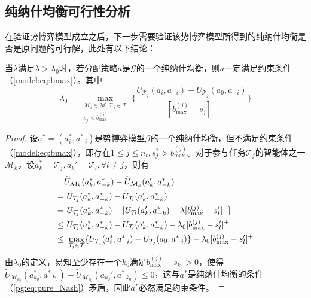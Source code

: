\subsection{纯纳什均衡可行性分析}
\label{pg:mwlu:pgexist}
在验证势博弈模型成立之后，下一步需要验证该势博弈模型所得到的纯纳什均衡是否是原问题的可行解，此处有以下结论：

\begin{proposition}[纳什均衡可行性]
\label{pg:pro:feasibility}
	当$\lambda$满足$\lambda > \lambda_0$时，若分配策略$a$是$\mathcal{G}$的一个纯纳什均衡，则$a$一定满足约束条件（\ref{model:eq:bmax}）。其中
	\begin{equation}
		\lambda_0 = \max_{\substack{\mathcal{M}_i \in \mathcal{M}, \mathcal{T}_j \in \mathcal{T} \\ s_j < b_{\text{max}}^{(j)}}} \Bigg\{ \frac{U_{\mathcal{T}_j}(a_i,a_{-i}) - U_{\mathcal{T}_j}(a_0,a_{-i})}{[b_{\text{max}}^{(j)} - s_j]^+} \Bigg\}
	\end{equation}
	
	\begin{proof}
		设$a^*=(a_i^*,a_{-i}^*)$是势博弈模型$\mathcal{G}$的一个纯纳什均衡，但不满足约束条件（\ref{model:eq:bmax}），即存在$1\leq j \leq n_t, s_j^* > b_{\text{max}}^{(j)}$。对于参与任务$\mathcal{T}_j$的智能体之一$\mathcal{M}_k$，设$a_k^*=\mathcal{T}_j,a_k'=\mathcal{T}_l,\forall l \neq j$，则有
		\begin{align}
			&\widetilde U_{\mathcal{M}_k}(a_k^*,a_{-k}^*) - \widetilde U_{\mathcal{M}_k}(a_k',a_{-k}^*)\notag\\
		    =&\ \widetilde U_{\mathcal{T}_j}(a_k^*,a_{-k}^*) - \widetilde U_{\mathcal{T}_l}(a_k',a_{-k}^*)\notag\\
		    =&\ U_{\mathcal{T}_j}(a_k^*,a_{-k}^*) - [U_{\mathcal{T}_l}(a_k',a_{-k}^*) + \lambda[b_{\text{max}}^{(j)} - s_l']^+]\notag\\
		    \leq &\ U_{\mathcal{T}_j}(a_k^*,a_{-k}^*) - U_{\mathcal{T}_l}(a_k',a_{-k}^*) - \lambda_0[b_{\text{max}}^{(j)} - s_l']^+ \notag \\
		    \leq &\ \max_{\mathcal{T}_j \in \mathcal{T}} \{U_{\mathcal{T}_j}(a_i^*,a_{-i}^*) - U_{\mathcal{T}_j}(a_0,a_{-i}^*)\} - \lambda_0[b_{\text{max}}^{(j)} - s_l']^+
		\end{align}
		由$\lambda_0$的定义，易知至少存在一个$k_0$满足$b_{\text{max}}^{(j)} - s_{k_0}>0$，使得$\widetilde U_{\mathcal{M}_{k_0}}(a_{k_0}^*,a_{-{k_0}}^*) - \widetilde U_{\mathcal{M}_{k_0}}(a_{k_0}',a_{-{k_0}}^*) \leq 0$，这与$a^*$是纯纳什均衡的条件（\ref{pg:eq:pure_Nash}）矛盾，因此$a^*$必然满足约束条件。
	\end{proof}
	
\end{proposition}

